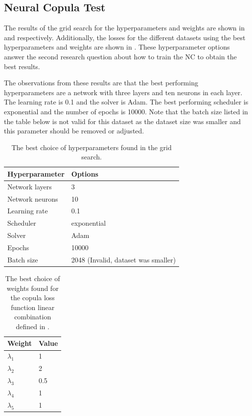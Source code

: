 \subsection{Neural Copula Test}
The results of the grid search for the hyperparameters and weights are shown in  and  respectively. Additionally, the losses for the different datasets using the best hyperparameters and weights are shown in . These hyperparameter options answer the second research question \RQtwo{} about how to train the \gls{NC} to obtain the best results. 

The observations from these results are that the best performing hyperparameters are a network with three layers and ten neurons in each layer. The learning rate is 0.1 and the solver is Adam. The best performing scheduler is exponential and the number of epochs is 10000. Note that the batch size listed in the table below is not valid for this dataset as the dataset size was smaller and this parameter should be removed or adjusted.

\begin{table}[h!]
    \centering
    \caption{The best choice of hyperparameters found in the grid search.}
    \begin{tabular}{ll}
    \textbf{Hyperparameter} & \textbf{Options} \\
    \hline
    Network layers & 3 \\
    Network neurons & 10 \\
    Learning rate & 0.1 \\
    Scheduler & exponential \\
    Solver & Adam \\
    Epochs & 10000 \\
    Batch size & 2048 (Invalid, dataset was smaller) \\
    \end{tabular}
    \label{tab:Best_hyperparams}
\end{table}

\begin{table}[h!]
    \centering
    \caption{The best choice of weights found for the copula loss function linear combination defined in .}
    \begin{tabular}{ll}
    \textbf{Weight} & \textbf{Value} \\
    \hline
    $\lambda_1$ & 1 \\
    $\lambda_2$ & 2 \\
    $\lambda_3$ & 0.5 \\
    $\lambda_4$ & 1 \\
    $\lambda_5$ & 1 \\
    \end{tabular}
    \label{tab:Best_weights}
\end{table}

